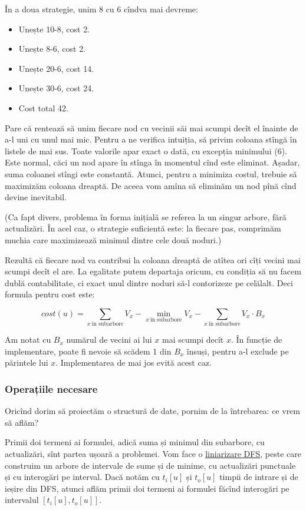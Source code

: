 \documentclass[../main.tex]{subfiles}
\begin{document}
În a doua strategie, unim 8 cu 6 cîndva mai devreme:

\begin{itemize}
  \item Unește 10-8, cost 2.
  \item Unește 8-6, cost 2.
  \item Unește 20-6, cost 14.
  \item Unește 30-6, cost 24.
  \item Cost total 42.
\end{itemize}

Pare că rentează să unim fiecare nod cu vecinii săi mai scumpi decît el înainte de a-l uni cu unul mai mic. Pentru a ne verifica intuiția, să privim coloana stîngă în listele de mai sus. Toate valorile apar exact o dată, cu excepția minimului (6). Este normal, căci un nod apare în stînga în momentul cînd este eliminat. Așadar, suma coloanei stîngi este constantă. Atunci, pentru a minimiza costul, trebuie să maximizăm coloana dreaptă. De aceea vom amîna să eliminăm un nod pînă cînd devine inevitabil.

(Ca fapt divers, problema în forma inițială se referea la un singur arbore, fără actualizări. În acel caz, o strategie suficientă este: la fiecare pas, comprimăm muchia care maximizează minimul dintre cele două noduri.)

Rezultă că fiecare nod va contribui la coloana dreaptă de atîtea ori cîți vecini mai scumpi decît el are. La egalitate putem departaja oricum, cu condiția să nu facem dublă contabilitate, ci exact unul dintre noduri să-l contorizeze pe celălalt. Deci formula pentru cost este:

$$cost(u) = \sum_{x\ \text{în subarbore}} V_x - \min_{x\ \text{în subarbore}} V_x - \sum_{x\ \text{în subarbore}}V_x \cdot B_x$$

Am notat cu $B_x$ numărul de vecini ai lui $x$ mai scumpi decît $x$. În funcție de implementare, poate fi nevoie să scădem 1 din $B_x$ însuși, pentru a-l exclude pe părintele lui $x$. Implementarea de mai jos evită acest caz.

\subsubsection*{Operațiile necesare}

Oricînd dorim să proiectăm o structură de date, pornim de la întrebarea: ce vrem să aflăm?

Primii doi termeni ai formulei, adică suma și minimul din subarbore, cu actualizări, sînt partea ușoară a problemei. Vom face o \hyperref[sec:linearization-types]{liniarizare DFS}, peste care construim un arbore de intervale de sume și de minime, cu actualizări punctuale și cu interogări pe interval. Dacă notăm cu $t_i[u]$ și $t_o[u]$ timpii de intrare și de ieșire din DFS, atunci aflăm primii doi termeni ai formulei făcînd interogări pe intervalul $[t_i[u], t_o[u]]$.
\end{document}
